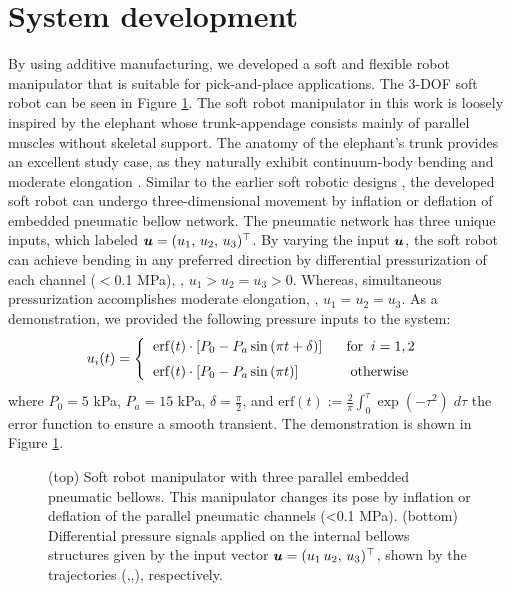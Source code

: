 \section{System development}
By using additive manufacturing, we developed a soft and flexible robot manipulator that is suitable for pick-and-place applications. The 3-DOF soft robot can be seen in Figure \ref{fig:C2:soft_robot}. The soft robot manipulator in this work is loosely inspired by the elephant whose trunk-appendage consists mainly of parallel muscles without skeletal support. The anatomy of the elephant's trunk provides an excellent study case, as they naturally exhibit continuum-body bending and moderate elongation \cite{Falkenhahn2015,Jones2006,Tatlicioglu2007}. Similar to the earlier soft robotic designs
\cite{Suzumori1991,Falkenhahn2015}, the developed soft robot can undergo three-dimensional movement by inflation or deflation of embedded pneumatic bellow network. The pneumatic network has three unique inputs, which labeled ${\boldsymbol{u}} = (u_1,\,u_2,\,u_3)^\top$. By varying the input ${\boldsymbol{u}}$, the soft robot can achieve bending in any preferred direction by differential pressurization of each channel ($<$0.1 \si{\mega \pascal}), \eg, $u_1 > u_2 = u_3 > 0$. Whereas, simultaneous pressurization accomplishes moderate elongation, \ie, $u_1 = u_2 = u_3$. As a demonstration, we provided the following pressure inputs to the system:
%
\begin{align}
  u_i(t) = \begin{cases}
          \;\;\textup{\textrm{erf}}(t)\cdot \left[P_0 - P_a\sin\left(\pi t + \delta\right)\right] \quad\;\; \textrm{for}\;\; i = 1,2 \\[0.35em]
          \;\;\textup{\textrm{erf}}(t)\cdot \left[P_0 - P_a\sin\left(\pi t \right)\right] \quad\quad\quad\;\; \textrm{otherwise}\;\ \\
           \end{cases}
\end{align}
%
where $P_0 = 5$ \si{\kilo \pascal}, $P_a = 15$ \si{\kilo \pascal}, $\delta = \frac{\pi}{2}$, and $\textrm{erf}(t) := \frac{2}{\pi}\int_0^\tau \exp(-\tau^2) \; d\tau$   the error function to ensure a smooth transient. The demonstration is shown in Figure \ref{fig:C2:soft_robot}.

%
\begin{figure}[!h]
 \vspace{-3mm}
  \centering
  
   \vspace{2mm}
    
     \vspace{-3mm}
    
  \caption{(top) Soft robot manipulator with three parallel embedded pneumatic bellows. This manipulator changes its pose by inflation or deflation of the parallel pneumatic channels (<0.1 \si{\mega \pascal}). (bottom) Differential pressure signals applied on the internal bellows structures given by the input vector ${\boldsymbol{u}} = (u_1\,u_2,\,u_3)^\top$, shown by the trajectories (,,), respectively.}
  \vspace{-0.1cm}
  \label{fig:C2:soft_robot}
\end{figure}
%

